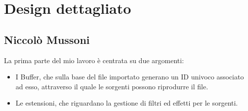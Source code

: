 \documentclass[a4paper,12pt]{report}
\begin{document}
\section{Design dettagliato}
\subsection*{Niccolò Mussoni}
La prima parte del mio lavoro è centrata su due argomenti:
\begin{itemize}
	\item I Buffer, che sulla base del file importato generano un ID univoco associato ad esso, attraverso il quale le sorgenti possono riprodurre il file. 
	\item Le estensioni, che riguardano la gestione di filtri ed effetti per le sorgenti.
\end{itemize}
\end{document}
